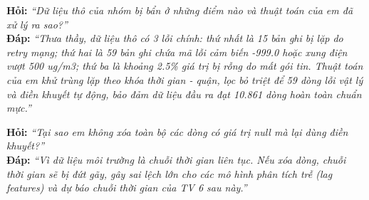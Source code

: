 \documentclass[11pt,a4paper]{article}
\begin{document}
\begin{tcolorbox}[colback=blue!5!white, colframe=blue!60!black, fonttitle=\bfseries\color{white}, title={BỘ CÂU HỎI VẤN ĐÁP TRỌNG TÂM DÀNH CHO TV 2}]
\textbf{Hỏi:} \textit{“Dữ liệu thô của nhóm bị bẩn ở những điểm nào và thuật toán của em đã xử lý ra sao?”}\\
\textbf{Đáp:} \textit{“Thưa thầy, dữ liệu thô có 3 lỗi chính: thứ nhất là 15 bản ghi bị lặp do retry mạng; thứ hai là 59 bản ghi chứa mã lỗi cảm biến -999.0 hoặc xung điện vượt 500 ug/m3; thứ ba là khoảng 2.5\% giá trị bị rỗng do mất gói tin. Thuật toán của em khử trùng lặp theo khóa thời gian - quận, lọc bỏ triệt để 59 dòng lỗi vật lý và điền khuyết tự động, bảo đảm dữ liệu đầu ra đạt 10.861 dòng hoàn toàn chuẩn mực.”}

\textbf{Hỏi:} \textit{“Tại sao em không xóa toàn bộ các dòng có giá trị null mà lại dùng điền khuyết?”}\\
\textbf{Đáp:} \textit{“Vì dữ liệu môi trường là chuỗi thời gian liên tục. Nếu xóa dòng, chuỗi thời gian sẽ bị đứt gãy, gây sai lệch lớn cho các mô hình phân tích trễ (lag features) và dự báo chuỗi thời gian của TV 6 sau này.”}
\end{tcolorbox}

\end{document}
